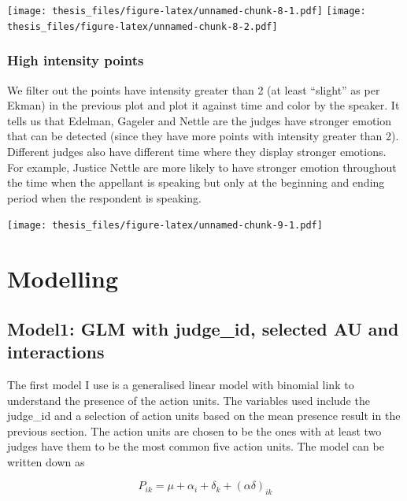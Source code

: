 \documentclass{monashthesis}
\begin{document}
\texttt{[image: thesis\_files/figure-latex/unnamed-chunk-8-1.pdf]} \texttt{[image: thesis\_files/figure-latex/unnamed-chunk-8-2.pdf]}

\hypertarget{high-intensity-points}{%
\subsection{High intensity points}\label{high-intensity-points}}

We filter out the points have intensity greater than 2 (at least ``slight'' as per Ekman) in the previous plot and plot it against time and color by the speaker. It tells us that Edelman, Gageler and Nettle are the judges have stronger emotion that can be detected (since they have more points with intensity greater than 2). Different judges also have different time where they display stronger emotions. For example, Justice Nettle are more likely to have stronger emotion throughout the time when the appellant is speaking but only at the beginning and ending period when the respondent is speaking.

\texttt{[image: thesis\_files/figure-latex/unnamed-chunk-9-1.pdf]}

\hypertarget{modelling}{%
\chapter{Modelling}\label{modelling}}

\hypertarget{model1-glm-with-judge_id-selected-au-and-interactions}{%
\section{Model1: GLM with judge\_id, selected AU and interactions}\label{model1-glm-with-judge_id-selected-au-and-interactions}}

The first model I use is a generalised linear model with binomial link to understand the presence of the action units. The variables used include the judge\_id and a selection of action units based on the mean presence result in the previous section. The action units are chosen to be the ones with at least two judges have them to be the most common five action units. The model can be written down as

\[P_{ik} = \mu + \alpha_i + \delta_k + (\alpha\delta)_{ik}\]
\end{document}
